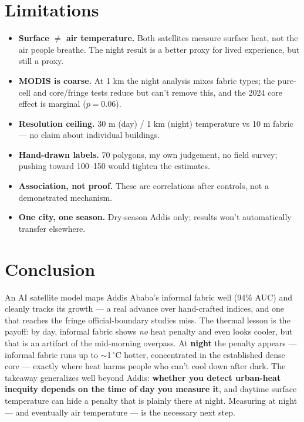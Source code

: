 \documentclass[11pt]{article}
\newcommand{\dC}{\ensuremath{\,^{\circ}\mathrm{C}}}
\begin{document}
\section{Limitations}
\begin{itemize}[leftmargin=1.4em, itemsep=1pt]
  \item \textbf{Surface $\neq$ air temperature.} Both satellites measure
  surface heat, not the air people breathe. The night result is a better proxy
  for lived experience, but still a proxy.
  \item \textbf{MODIS is coarse.} At 1 km the night analysis mixes fabric
  types; the pure-cell and core/fringe tests reduce but can't remove this, and
  the 2024 core effect is marginal ($p=0.06$).
  \item \textbf{Resolution ceiling.} 30 m (day) / 1 km (night) temperature vs
  10 m fabric --- no claim about individual buildings.
  \item \textbf{Hand-drawn labels.} 70 polygons, my own judgement, no field
  survey; pushing toward 100--150 would tighten the estimates.
  \item \textbf{Association, not proof.} These are correlations after controls,
  not a demonstrated mechanism.
  \item \textbf{One city, one season.} Dry-season Addis only; results won't
  automatically transfer elsewhere.
\end{itemize}

\section{Conclusion}
An AI satellite model maps Addis Ababa's informal fabric well (94\% AUC) and
cleanly tracks its growth --- a real advance over hand-crafted indices, and one
that reaches the fringe official-boundary studies miss. The thermal lesson is
the payoff: by day, informal fabric shows \emph{no} heat penalty and even looks
cooler, but that is an artifact of the mid-morning overpass. At \textbf{night}
the penalty appears --- informal fabric runs up to $\sim$1\dC{} hotter,
concentrated in the established dense core --- exactly where heat harms people
who can't cool down after dark. The takeaway generalizes well beyond Addis:
\textbf{whether you detect urban-heat inequity depends on the time of day you
measure it}, and daytime surface temperature can hide a penalty that is plainly
there at night. Measuring at night --- and eventually air temperature --- is
the necessary next step.
\end{document}
